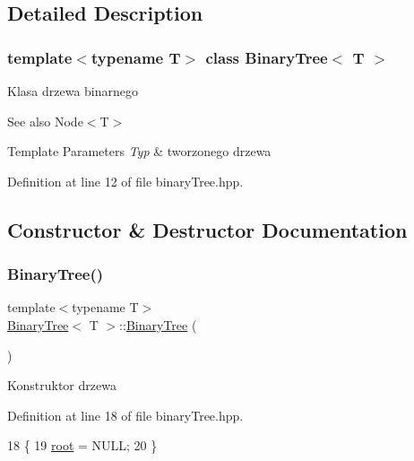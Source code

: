 \subsection{Detailed Description}
\subsubsection*{template$<$typename T$>$\newline
class Binary\+Tree$<$ T $>$}

Klasa drzewa binarnego \begin{DoxySeeAlso}{See also}
Node$<$\+T$>$ 
\end{DoxySeeAlso}

\begin{DoxyTemplParams}{Template Parameters}
{\em Typ} & tworzonego drzewa \\
\hline
\end{DoxyTemplParams}


Definition at line 12 of file binary\+Tree.\+hpp.



\subsection{Constructor \& Destructor Documentation}
\mbox{\label{classBinaryTree_a9202cce23960faf8f647c6765decccd4}} 
\subsubsection{\texorpdfstring{Binary\+Tree()}{BinaryTree()}}
{\footnotesize\ttfamily template$<$typename T$>$ \\
\hyperlink{classBinaryTree}{Binary\+Tree}$<$ T $>$\+::\hyperlink{classBinaryTree}{Binary\+Tree} (\begin{DoxyParamCaption}{ }\end{DoxyParamCaption})\hspace{0.3cm}{\ttfamily [inline]}}

Konstruktor drzewa 

Definition at line 18 of file binary\+Tree.\+hpp.


\begin{DoxyCode}
18                      \{
19             \hyperlink{classBinaryTree_a2db40f59d96afceb1a005e6d9aef2374}{root} = NULL;
20         \}
\end{DoxyCode}
\mbox{\label{classBinaryTree_a390c319c0b28b958463851119edb8af3}} 
